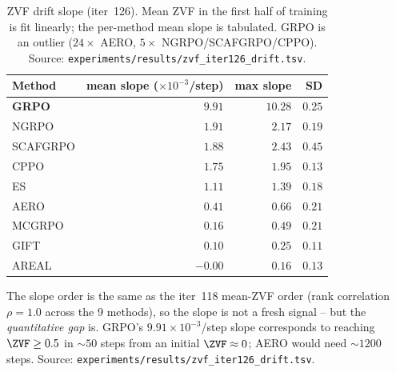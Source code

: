 \begin{table}[htbp]
\centering\small
\setlength{\tabcolsep}{4pt}
\begin{tabular}{lrrr}
\hline
Method & mean slope ($\times 10^{-3}$/step) & max slope & SD \\
\hline
\textbf{GRPO}     & \textbf{$9.91$} & $10.28$ & $0.25$ \\
NGRPO             & $1.91$ & $2.17$ & $0.19$ \\
SCAFGRPO          & $1.88$ & $2.43$ & $0.45$ \\
CPPO              & $1.75$ & $1.95$ & $0.13$ \\
ES                & $1.11$ & $1.39$ & $0.18$ \\
AERO              & $0.41$ & $0.66$ & $0.21$ \\
MCGRPO            & $0.16$ & $0.49$ & $0.21$ \\
GIFT              & $0.10$ & $0.25$ & $0.11$ \\
AREAL             & $-0.00$ & $0.16$ & $0.13$ \\
\hline
\end{tabular}
\caption{ZVF drift slope (iter~126).  Mean ZVF in the first half
of training is fit linearly; the per-method mean slope is
tabulated.  GRPO is an outlier ($24\times$ AERO, $5\times$
NGRPO/SCAFGRPO/CPPO).  Source:
\texttt{experiments/results/zvf\_iter126\_drift.tsv}.}
\label{tab:zvf-iter126-drift}
\end{table}

The slope order is the same as the iter~118 mean-ZVF order
(rank correlation $\rho=1.0$ across the 9 methods), so the
slope is not a fresh signal -- but the \emph{quantitative gap}
is.  GRPO's $9.91\times 10^{-3}$/step slope corresponds to
reaching $\ZVF\ge 0.5$ in $\sim 50$ steps from an initial
$\ZVF\approx 0$; AERO would need $\sim\!1200$ steps.  Source:
\texttt{experiments/results/zvf\_iter126\_drift.tsv}.

